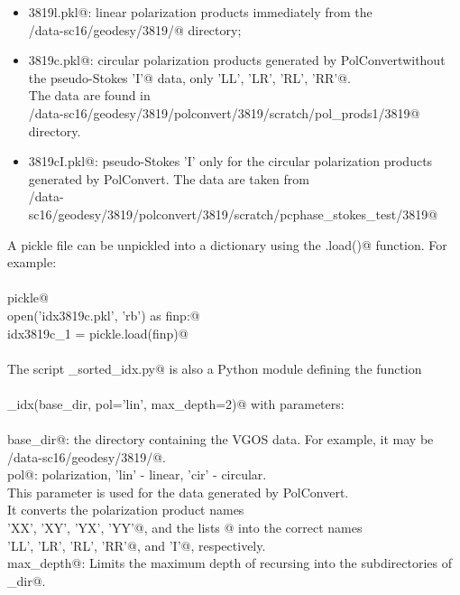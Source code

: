 \documentclass[letterpaper,twoside,12pt]{article}
\begin{document}
\begin{itemize}
  \item \verb@idx3819l.pkl@: linear polarization products immediately from the \\
  \verb@/data-sc16/geodesy/3819/@ directory;
  
  \item \verb@idx3819c.pkl@: circular polarization products generated by PolConvertwithout the pseudo-Stokes
      \verb@'I'@ data, only \verb@'LL', 'LR', 'RL', 'RR'@. \\
  The data are found in \\
  \verb@/data-sc16/geodesy/3819/polconvert/3819/scratch/pol_prods1/3819@ directory.

  \item \verb@idx3819cI.pkl@: pseudo-Stokes 'I' only for the circular polarization products generated by
  PolConvert. The data are taken from \\
  \verb@/data-sc16/geodesy/3819/polconvert/3819/scratch/pcphase_stokes_test/3819@ \\
\end{itemize}

A pickle file can be unpickled into a  dictionary using the \verb@pickle.load()@ function. For example: \\ \\
\noindent \verb@import pickle@ \\
\noindent \verb@with open('idx3819c.pkl', 'rb') as finp:@ \\
\noindent \verb@    idx3819c_1 = pickle.load(finp)@ \\ \\

\noindent The script \verb@make_sorted_idx.py@ is also a Python module defining the function \\ \\
\verb@make_idx(base_dir, pol='lin', max_depth=2)@ with parameters: \\ \\
\verb@    base_dir@: the directory containing the VGOS data. For example, it may be \\
\verb@              /data-sc16/geodesy/3819/@. \\
\verb@    pol@: polarization, 'lin' - linear, 'cir' - circular. \\
    \indent \indent \indent This parameter is used for the data generated by PolConvert. \\
    \indent \indent \indent It converts the polarization product names\\
    \verb@          'XX', 'XY', 'YX', 'YY'@, and the lists \verb@['XX', 'YY']@ into the correct names \\
    \verb@          'LL', 'LR', 'RL', 'RR'@, and \verb@'I'@, respectively. \\
\verb@    max_depth@: Limits the maximum depth of recursing into the subdirectories of \verb@base_dir@. \\
\end{document}
